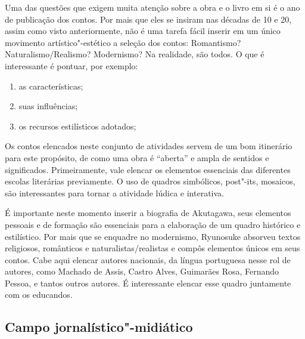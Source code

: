 \documentclass[12pt]{extarticle}
\begin{document}
Uma das questões que exigem muita atenção sobre a obra e o livro em si
é o ano de publicação dos contos. Por mais que eles se insiram nas
décadas de 10 e 20, assim como visto anteriormente, não é uma tarefa
fácil inserir em um único movimento artístico"-estético a seleção dos
contos: Romantismo? Naturalismo/Realismo? Modernismo? Na realidade,
são todos. O que é interessante é pontuar, por exemplo:

\begin{enumerate}
\item
  as características;
\item
  suas influências;
\item
  os recursos estilísticos adotados;
\end{enumerate}

Os contos elencados neste conjunto de atividades servem de um bom
itinerário para este propósito, de como uma obra é ``aberta'' e ampla de
sentidos e significados. Primeiramente, vale elencar os elementos
essenciais das diferentes escolas literárias previamente. O uso de
quadros simbólicos, post"-its, mosaicos, são interessantes para tornar a
atividade lúdica e interativa.

É importante neste momento inserir a biografia de Akutagawa, seus
elementos pessoais e de formação são essenciais para a elaboração de um
quadro histórico e estilístico. Por mais que se enquadre no modernismo,
Ryunosuke absorveu textos religiosos, românticos e
naturalistas/realistas e compôs elementos únicos em seus contos. Cabe
aqui elencar autores nacionais, da língua portuguesa nesse rol de
autores, como Machado de Assis, Castro Alves, Guimarães Rosa, Fernando
Pessoa, e tantos outros autores. É interessante elencar esse quadro
juntamente com os educandos.


\subsection{Campo jornalístico"-midiático}
\end{document}
